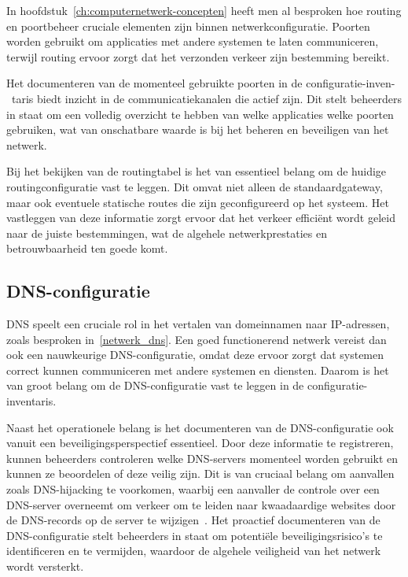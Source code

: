 In hoofdstuk~\ref{ch:computernetwerk-concepten} heeft men al besproken hoe routing en poortbeheer cruciale elementen zijn binnen netwerkconfiguratie.
Poorten worden gebruikt om applicaties met andere systemen te laten communiceren, terwijl routing ervoor zorgt dat het verzonden verkeer zijn bestemming bereikt.

Het documenteren van de momenteel gebruikte poorten in de configuratie-inven-\ taris biedt inzicht in de communicatiekanalen die actief zijn.
Dit stelt beheerders in staat om een volledig overzicht te hebben van welke applicaties welke poorten gebruiken, wat van onschatbare waarde is bij het beheren en beveiligen van het netwerk.

Bij het bekijken van de routingtabel is het van essentieel belang om de huidige routingconfiguratie vast te leggen.
Dit omvat niet alleen de standaardgateway, maar ook eventuele statische routes die zijn geconfigureerd op het systeem.
Het vastleggen van deze informatie zorgt ervoor dat het verkeer effici\"ent wordt geleid naar de juiste bestemmingen, wat de algehele netwerkprestaties en betrouwbaarheid ten goede komt.

\subsection{DNS-configuratie}
\label{risico_dns}

DNS speelt een cruciale rol in het vertalen van domeinnamen naar IP-adressen, zoals besproken in~\ref{netwerk_dns}.
Een goed functionerend netwerk vereist dan ook een nauwkeurige DNS-configuratie, omdat deze ervoor zorgt dat systemen correct kunnen communiceren met andere systemen en diensten.
Daarom is het van groot belang om de DNS-configuratie vast te leggen in de configuratie-inventaris.

Naast het operationele belang is het documenteren van de DNS-configuratie ook vanuit een beveiligingsperspectief essentieel.
Door deze informatie te registreren, kunnen beheerders controleren welke DNS-servers momenteel worden gebruikt en kunnen ze beoordelen of deze veilig zijn.
Dit is van cruciaal belang om aanvallen zoals DNS-hijacking te voorkomen, waarbij een aanvaller de controle over een DNS-server overneemt om verkeer om te leiden naar kwaadaardige websites door de DNS-records op de server te wijzigen~\autocite{shaikh2020overcoming}.
Het proactief documenteren van de DNS-configuratie stelt beheerders in staat om potenti\"ele beveiligingsrisico's te identificeren en te vermijden, waardoor de algehele veiligheid van het netwerk wordt versterkt.

